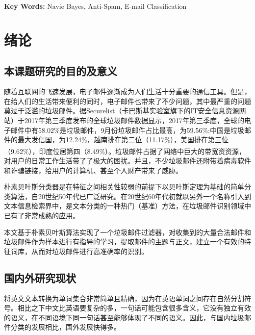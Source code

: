 \documentclass[UTF8,zihao=-4]{ctexart}
\newcommand{\upcite}[1]{\textsuperscript{\cite{#1}}}
\begin{document}
  \noindent{}\textbf{Key Words: }Navie Bayes, Anti-Spam, E-mail Classification
\newpage

\linespread{1.25}
\tableofcontents
\newpage

\songti{}
\newpage
\section{绪论}
\subsection{本课题研究的目的及意义}
随着互联网的飞速发展，电子邮件逐渐成为人们生活十分重要的通信工具。但是，在给人们的生活带来便利的同时，电子邮件也带来了不少问题，其中最严重的问题莫过于泛滥的垃圾邮件。据Securelist（卡巴斯基实验室旗下的IT安全信息资源网站）于2017年第三季度发布的全球垃圾邮件数据显示，2017年第三季度，全球的电子邮件中有58.02\%是垃圾邮件，9月份垃圾邮件占比最高，为59.56\%;中国是垃圾邮件的最大发信国，为12.24\%，越南排在第二位（11.17\%），美国排在第三位（9.62\%），印度位居第四（8.49\%）\upcite{securelist}。垃圾邮件占据了网络中巨大的带宽资资源，对用户的日常工作生活带了了极大的困扰。并且，不少垃圾邮件还附带着病毒软件和诈骗链接，给用户的计算机、甚至个人财产带来了威胁。

朴素贝叶斯分类器是在特征之间相关性较弱的前提下以贝叶斯定理为基础的简单分类算法，自20世纪50年代已广泛研究。在20世纪60年代初就以另外一个名称引入到文本信息检索界中，是文本分类的一种热门（基准）方法，在垃圾邮件识别领域中已有了非常成熟的应用。

本文基于朴素贝叶斯算法实现了一个垃圾邮件过滤器，对收集到的大量合法邮件和垃圾邮件作为样本进行有指导的学习，提取邮件的主题与正文，建立一个有效的特征词库，从而对垃圾邮件进行高准确率的识别。

\subsection{国内外研究现状}

将英文文本转换为单词集合非常简单且精确，因为在英语单词之间存在自然分割符号。相比之下中文比英语要复杂的多，一句话可能包含很多含义，它没有独立有效的语义，在不同语境下同一句话甚至能够体现了不同的语义。因此，与国内垃圾邮件分类的发展相比，国外发展快得多。
\end{document}
